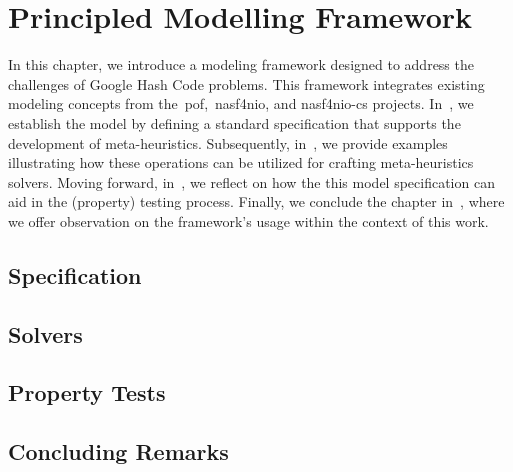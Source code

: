 \chapter{Principled Modelling Framework}
\label{ch:principled-modelling-framework}


In this chapter, we introduce a modeling framework designed to address the
challenges of Google Hash Code problems. This framework integrates existing
modeling concepts from the~\acrshort{pof},~\acrshort{nasf4nio}, and
\acrshort{nasf4nio-cs} projects. In~, we establish the
model by defining a standard specification that supports the development of
meta-heuristics. Subsequently, in~, we provide examples
illustrating how these operations can be utilized for crafting meta-heuristics
solvers. Moving forward, in~, we reflect on how the this model
specification can aid in the (property) testing process. Finally, we conclude
the chapter in~, where we offer observation on
the framework's usage within the context of this work.

\section{Specification}
\label{sec:specification}


\section{Solvers}
\label{sec:solver}


\section{Property Tests}
\label{sec:tests}


\section{Concluding Remarks}
\label{sec:pmf-concluding-remarks}
